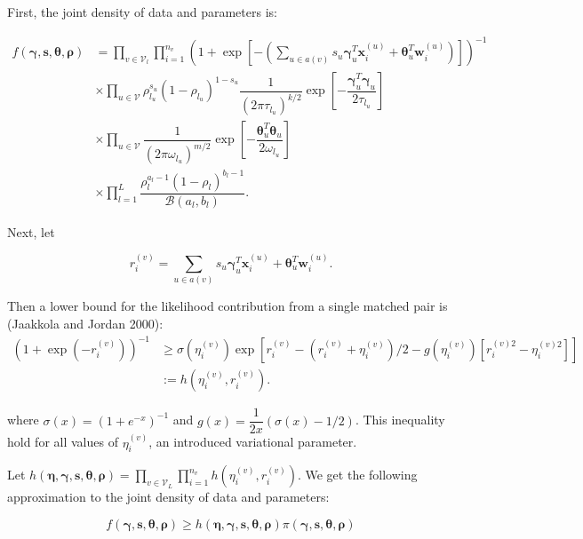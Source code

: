 \documentclass[]{article}
\begin{document}
First, the joint density of data and parameters is:

\begin{align*}
f \left(\boldsymbol{\gamma}, \mathbf{s}, \boldsymbol{\theta}, \boldsymbol{\rho} \right) 
& = \prod_{v \in \mathcal{V}_l} \prod_{i = 1}^{n_v} \left(1 + \exp \left[-\left(\sum_{u \in a(v)} s_u \boldsymbol{\gamma}_u^T \mathbf{x}_{i}^{(u)} + \boldsymbol{\theta}_u^T \mathbf{w}_i^{(u)} \right) \right] \right)^{-1} \\
& \times \prod_{u \in \mathcal{V}} \rho_{l_u}^{s_u} (1-\rho_{l_u})^{1-s_u} \dfrac{1}{\left(2\pi\tau_{l_u}\right)^{k/2}} \exp\left[-\dfrac{\boldsymbol{\gamma}_u^T\boldsymbol{\gamma}_u}{2\tau_{l_u}}\right] \\
& \times \prod_{u \in \mathcal{V}} \dfrac{1}{\left(2\pi\omega_{l_u}\right)^{m/2}} \exp\left[-\dfrac{\boldsymbol{\theta}_u^T\boldsymbol{\theta}_u}{2\omega_{l_u}}\right] \\
& \times \prod_{l=1}^L \dfrac{\rho_l^{a_l -1} (1 - \rho_l)^{b_l - 1}}{\mathcal{B}(a_l, b_l)}.
\end{align*}

Next, let

\[r_i^{(v)} = \sum_{u \in a(v)} s_u \boldsymbol{\gamma}_u^T \mathbf{x}_{i}^{(u)} + \boldsymbol{\theta}_u^T \mathbf{w}_i^{(u)}.\]

Then a lower bound for the likelihood contribution from a single matched
pair is (Jaakkola and Jordan 2000): \begin{align*}
     \left(1 + \exp(-r_i^{(v)}) \right)^{-1}
    & \geq \sigma(\eta_i^{(v)}) \exp \left[ r_i^{(v)} - \left(r_i^{(v)} + \eta_i^{(v)} \right) /2 -g(\eta_i^{(v)}) \left[r_i^{(v)2} - \eta_i^{(v)2} \right] \right] \\
    & := h\left(\eta_i^{(v)}, r_i^{(v)} \right).
\end{align*}

where \(\sigma(x) = (1 + e^{-x})^{-1}\) and
\(g(x) = \dfrac{1}{2x}(\sigma(x) - 1/2)\). This inequality hold for all
values of \(\eta_i^{(v)}\), an introduced variational parameter.

Let
\(h\left(\boldsymbol{\eta}, \boldsymbol{\gamma}, \mathbf{s}, \boldsymbol{\theta}, \boldsymbol{\rho} \right) = \prod_{v \in \mathcal{V}_L} \prod_{i=1}^{n_v} h\left(\eta_i^{(v)}, r_i^{(v)} \right)\).
We get the following approximation to the joint density of data and
parameters:

\begin{equation*}
f \left(\boldsymbol{\gamma}, \mathbf{s}, \boldsymbol{\theta}, \boldsymbol{\rho} \right) \geq h\left(\boldsymbol{\eta}, \boldsymbol{\gamma}, \mathbf{s}, \boldsymbol{\theta}, \boldsymbol{\rho} \right) \pi \left(\boldsymbol{\gamma}, \mathbf{s}, \boldsymbol{\theta}, \boldsymbol{\rho} \right)
\end{equation*}
\end{document}
